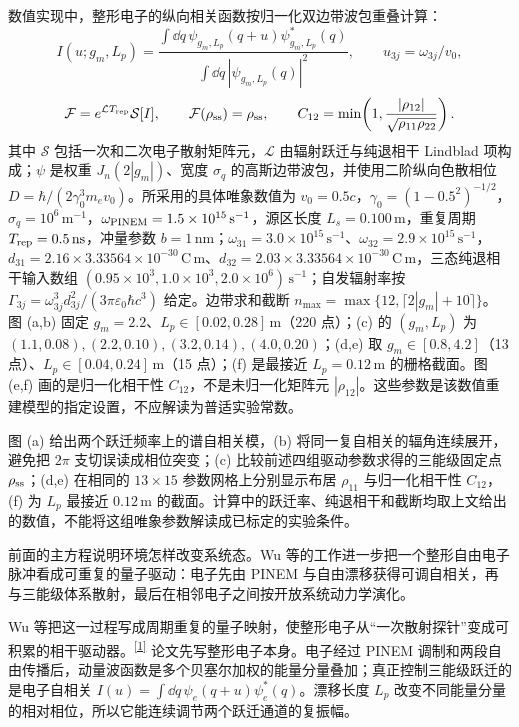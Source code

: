 数值实现中，整形电子的纵向相关函数按归一化双边带波包重叠计算：
\[I(u;g_m,L_p)=\frac{\int \dd q\,\psi_{g_m,L_p}(q+u)\psi^*_{g_m,L_p}(q)}{\int \dd q\,|\psi_{g_m,L_p}(q)|^2},\qquad u_{3j}=\omega_{3j}/v_0,\]
\[\mathcal F=e^{\mathcal L T_{\rm rep}}\mathcal S[I],\qquad \mathcal F(\rho_{\rm ss})=\rho_{\rm ss},\qquad C_{12}=\min\!\left(1,\frac{|\rho_{12}|}{\sqrt{\rho_{11}\rho_{22}}}\right).\]
其中 $\mathcal S$ 包括一次和二次电子散射矩阵元，$\mathcal L$ 由辐射跃迁与纯退相干 Lindblad 项构成；$\psi$ 是权重 $J_n(2|g_m|)$、宽度 $\sigma_q$ 的高斯边带波包，并使用二阶纵向色散相位 $D=\hbar/(2\gamma_0^3m_ev_0)$。所采用的具体唯象数值为 $v_0=0.5c$，$\gamma_0=(1-0.5^2)^{-1/2}$，$\sigma_q=10^6\,\mathrm{m}^{-1}$，$\omega_{\rm PINEM}=1.5\times10^{15}\,\mathrm{s}^{-1}$，源区长度 $L_s=0.100\,\mathrm m$，重复周期 $T_{\rm rep}=0.5\,\mathrm{ns}$，冲量参数 $b=1\,\mathrm{nm}$；$\omega_{31}=3.0\times10^{15}\,\mathrm{s}^{-1}$、$\omega_{32}=2.9\times10^{15}\,\mathrm{s}^{-1}$，$d_{31}=2.16\times3.33564\times10^{-30}\,\mathrm{C\,m}$、$d_{32}=2.03\times3.33564\times10^{-30}\,\mathrm{C\,m}$，三态纯退相干输入数组 $(0.95\times10^3,1.0\times10^3,2.0\times10^6)\,\mathrm{s}^{-1}$；自发辐射率按 $\Gamma_{3j}=\omega_{3j}^3d_{3j}^2/(3\pi\varepsilon_0\hbar c^3)$ 给定。边带求和截断 $n_{\max}=\max\{12,\lceil2|g_m|+10\rceil\}$。
图 (a,b) 固定 $g_m=2.2$、$L_p\in[0.02,0.28]\,\mathrm m$（220 点）；(c) 的 $(g_m,L_p)$ 为 $(1.1,0.08),(2.2,0.10),(3.2,0.14),(4.0,0.20)$；(d,e) 取 $g_m\in[0.8,4.2]$（13 点）、$L_p\in[0.04,0.24]\,\mathrm m$（15 点）；(f) 是最接近 $L_p=0.12\,\mathrm m$ 的栅格截面。图 (e,f) 画的是归一化相干性 $C_{12}$，不是未归一化矩阵元 $|\rho_{12}|$。这些参数是该数值重建模型的指定设置，不应解读为普适实验常数。

图 (a) 给出两个跃迁频率上的谱自相关模，(b) 将同一复自相关的辐角连续展开，避免把 $2\pi$ 支切误读成相位突变；(c) 比较前述四组驱动参数求得的三能级固定点 $\rho_{\rm ss}$；(d,e) 在相同的 $13\times15$ 参数网格上分别显示布居 $\rho_{11}$ 与归一化相干性 $C_{12}$，(f) 为 $L_p$ 最接近 $0.12\,\mathrm m$ 的截面。计算中的跃迁率、纯退相干和截断均取上文给出的数值，不能将这组唯象参数解读成已标定的实验条件。


前面的主方程说明环境怎样改变系统态。Wu 等的工作进一步把一个整形自由电子脉冲看成可重复的量子驱动：电子先由 PINEM 与自由漂移获得可调自相关，再与三能级体系散射，最后在相邻电子之间按开放系统动力学演化。

Wu 等把这一过程写成周期重复的量子映射，使整形电子从“一次散射探针”变成可积累的相干驱动器。\textsuperscript{\hyperref[ch05-ref1]{[1]}}
论文先写整形电子本身。电子经过 PINEM 调制和两段自由传播后，动量波函数是多个贝塞尔加权的能量分量叠加；真正控制三能级跃迁的是电子自相关 $I(u)=\int \dd q\,\psi_e(q+u)\psi_e^*(q)$。漂移长度 $L_p$ 改变不同能量分量的相对相位，所以它能连续调节两个跃迁通道的复振幅。


